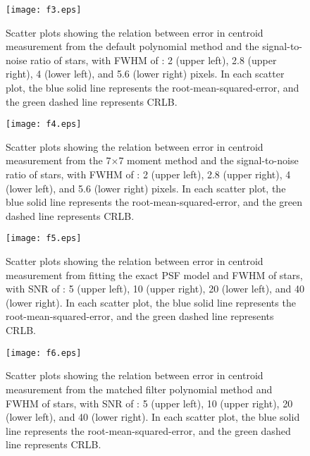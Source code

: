 \documentclass[12pt, preprint]{aastex}
\begin{document}
\begin{figure}[!htb]
  \texttt{[image: f3.eps]}
\endminipage
\caption{Scatter plots showing the relation between error in centroid measurement from the default polynomial method and the signal-to-noise ratio of stars, with FWHM of : 2 (upper left), 2.8 (upper right), 4 (lower left), and 5.6 (lower right) pixels. In each scatter plot, the blue solid line represents the root-mean-squared-error, and the green dashed line represents CRLB.}\label{3}
\end{figure}

\begin{figure}[!htb]
  \texttt{[image: f4.eps]}
\endminipage
\caption{Scatter plots showing the relation between error in centroid measurement from the 7$\times$7 moment method and the signal-to-noise ratio of stars, with FWHM of : 2 (upper left), 2.8 (upper right), 4 (lower left), and 5.6 (lower right) pixels. In each scatter plot, the blue solid line represents the root-mean-squared-error, and the green dashed line represents CRLB.}\label{4}
\end{figure}


\begin{figure}[!htb]
  \texttt{[image: f5.eps]}
\endminipage
\caption{Scatter plots showing the relation between error in centroid measurement
from fitting the exact PSF model and FWHM of stars, with SNR  of : 5 (upper left),
10 (upper right), 20 (lower left), and 40 (lower right). In each scatter plot,
the blue solid
 line represents the root-mean-squared-error, and the green dashed line represents CRLB.}\label{5}
\end{figure}

\begin{figure}[!htb]
  \texttt{[image: f6.eps]}
\endminipage
\caption{Scatter plots showing the relation between error in centroid measurement
from the matched filter polynomial method and FWHM of stars, with SNR  of : 5 (upper left),
10 (upper right), 20 (lower left), and 40 (lower right). In each scatter plot, the blue solid
 line represents the root-mean-squared-error, and the green dashed line represents CRLB.}\label{6}
\end{figure}
\end{document}
